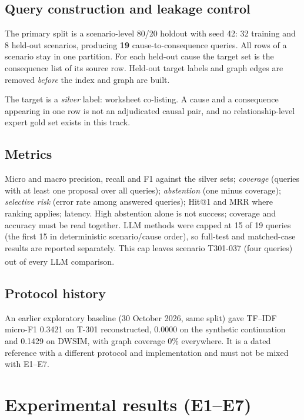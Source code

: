 \documentclass[10pt,twocolumn,a4paper]{extarticle}
\newcommand{\silver}{\emph{silver}}
\newcommand{\derived}{\textsuperscript{\textdagger}}
\begin{document}
\subsection{Query construction and leakage control}
The primary split is a scenario-level 80/20 holdout with seed 42: 32 training and 8 held-out scenarios, producing \textbf{19} cause-to-consequence queries. All rows of a scenario stay in one partition. For each held-out cause the target set is the consequence list of its source row. Held-out target labels and graph edges are removed \emph{before} the index and graph are built.

\begin{caution}
The target is a \silver{} label: worksheet co-listing. A cause and a consequence appearing in one row is not an adjudicated causal pair, and no relationship-level expert gold set exists in this track.
\end{caution}

\subsection{Metrics}
Micro and macro precision, recall and F1 against the silver sets; \emph{coverage} (queries with at least one proposal over all queries); \emph{abstention} (one minus coverage); \emph{selective risk} (error rate among answered queries); Hit@1 and MRR where ranking applies; latency. High abstention alone is not success; coverage and accuracy must be read together. LLM methods were capped at 15 of 19 queries (the first 15 in deterministic scenario/cause order), so full-test and matched-case results are reported separately. This cap leaves scenario T301-037 (four queries) out of every LLM comparison.\derived{}

\subsection{Protocol history}
An earlier exploratory baseline (30 October 2026, same split) gave TF--IDF micro-F1 0.3421 on T-301 reconstructed, 0.0000 on the synthetic continuation and 0.1429 on DWSIM, with graph coverage 0\% everywhere. It is a dated reference with a different protocol and implementation and must not be mixed with E1--E7.

\section{Experimental results (E1--E7)}\label{ch:results}
\end{document}
